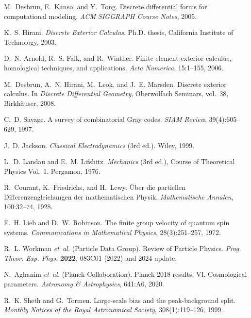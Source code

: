 \documentclass[11pt]{article}
\begin{document}

\begin{thebibliography}{99}

M.~Desbrun, E.~Kanso, and Y.~Tong.
Discrete differential forms for computational modeling.
\emph{ACM SIGGRAPH Course Notes}, 2005.

K.~S. Hirani.
\emph{Discrete Exterior Calculus}.
Ph.D. thesis, California Institute of Technology, 2003.

D.~N. Arnold, R.~S. Falk, and R.~Winther.
Finite element exterior calculus, homological techniques, and applications.
\emph{Acta Numerica}, 15:1--155, 2006.

M.~Desbrun, A.~N. Hirani, M.~Leok, and J.~E. Marsden.
Discrete exterior calculus.
In \emph{Discrete Differential Geometry}, Oberwolfach Seminars, vol.~38, Birkhäuser, 2008.

C.~D. Savage.
A survey of combinatorial Gray codes.
\emph{SIAM Review}, 39(4):605--629, 1997.

J.~D. Jackson.
\emph{Classical Electrodynamics} (3rd ed.).
Wiley, 1999.

L.~D. Landau and E.~M. Lifshitz.
\emph{Mechanics} (3rd ed.), Course of Theoretical Physics Vol.~1.
Pergamon, 1976.

R.~Courant, K.~Friedrichs, and H.~Lewy.
Über die partiellen Differenzengleichungen der mathematischen Physik.
\emph{Mathematische Annalen}, 100:32--74, 1928.

E.~H. Lieb and D.~W. Robinson.
The finite group velocity of quantum spin systems.
\emph{Communications in Mathematical Physics}, 28(3):251--257, 1972.

R.~L. Workman \emph{et~al.} (Particle Data Group).
Review of Particle Physics.
\emph{Prog. Theor. Exp. Phys.} \textbf{2022}, 083C01 (2022) and 2024 update.

N.~Aghanim \emph{et~al.} (Planck Collaboration).
Planck 2018 results. VI. Cosmological parameters.
\emph{Astronomy \& Astrophysics}, 641:A6, 2020.

R.~K. Sheth and G.~Tormen.
Large-scale bias and the peak-background split.
\emph{Monthly Notices of the Royal Astronomical Society}, 308(1):119--126, 1999.


\end{thebibliography}
\end{document}
